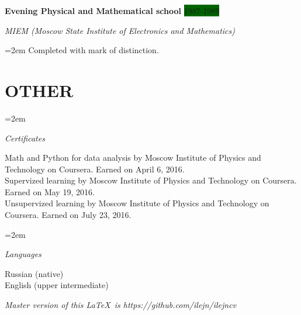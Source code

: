 \documentclass[paper=a4,fontsize=10.5pt]{scrartcl} %
\newlength{\spacebox}
\newcommand{\NewPart}[1]{\section*{\uppercase{#1}}}
\newcommand{\SkillsEntry}[2]{\pagebreak[2]
        \noindent\hangindent=2em\hangafter=0 %
        \parbox{\spacebox}{        %
        \textit{#1}}               %
        \hspace{1.5em} \vspace{1em}  \parbox{0.77\textwidth}{#2} \par}    %
\newcommand{\EducationEntry}[4]{\pagebreak[2]
        \noindent \textbf{#1} \hfill      %
        \colorbox{DarkGreen}{%
            \hfill\color{White}#2} \par  %
        \noindent \textit{#3} \par        %
        \noindent\hangindent=2em\hangafter=0 \small #4 %
        \normalsize \par}
\newcommand{\BottomLine}[1]{
        \vfill\center\textit{#1}\par
        }
\begin{document}
\EducationEntry{Evening Physical and Mathematical school}{1987-1989}{MIEM (Moscow State Institute of Electronics and Mathematics)}{Completed with mark of distinction.}

\NewPart{Other}{}


\SkillsEntry{Certificates}{Math and Python for data analysis by Moscow Institute of Physics and Technology on Coursera. Earned on April 6, 2016. \\
  Supervized learning by Moscow Institute of Physics and Technology on Coursera. Earned on May 19, 2016. \\
  Unsupervized learning by Moscow Institute of Physics and Technology on Coursera. Earned on July 23, 2016.}

\SkillsEntry{Languages}{Russian (native)  \\
   English (upper intermediate)}


\BottomLine{Master version of this \LaTeX \ is https://github.com/ilejn/ilejncv }
\end{document}
